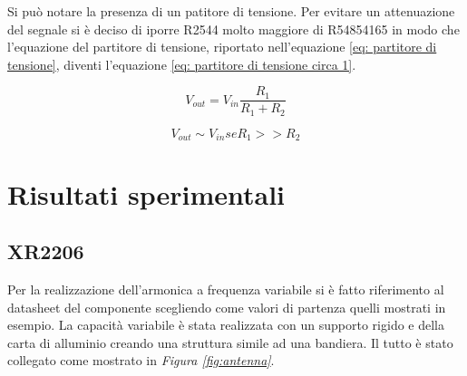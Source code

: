\documentclass[titlepage]{report}
\begin{document}
Si può notare la presenza di un patitore di tensione. Per evitare un attenuazione del segnale si è deciso di iporre R2544 molto maggiore di R54854165 in modo che l'equazione del partitore di tensione, riportato nell'equazione \ref{eq: partitore di tensione}, diventi l'equazione \ref{eq: partitore di tensione circa 1}.

\begin{equation}
	V_{out} = V_{in} \frac{R_1}{R_1 + R_2}
	\label{eq: partitore di tensione}
\end{equation}

\begin{equation}
	V_{out} \sim  V_{in}   se   R_1 >> R_2
	\label{eq: partitore di tensione circa 1}
\end{equation}
	
\chapter{Risultati sperimentali}
\label{ch:Risultati_sperimentali}
\section{XR2206}
	Per la realizzazione dell'armonica a frequenza variabile si è fatto riferimento al datasheet del componente scegliendo come valori di partenza quelli mostrati in esempio. 
	La capacità variabile è stata realizzata con un supporto rigido e della carta di alluminio creando una struttura simile ad una bandiera. Il tutto è stato collegato come mostrato in \textit{Figura \ref{fig:antenna}}.
\end{document}
